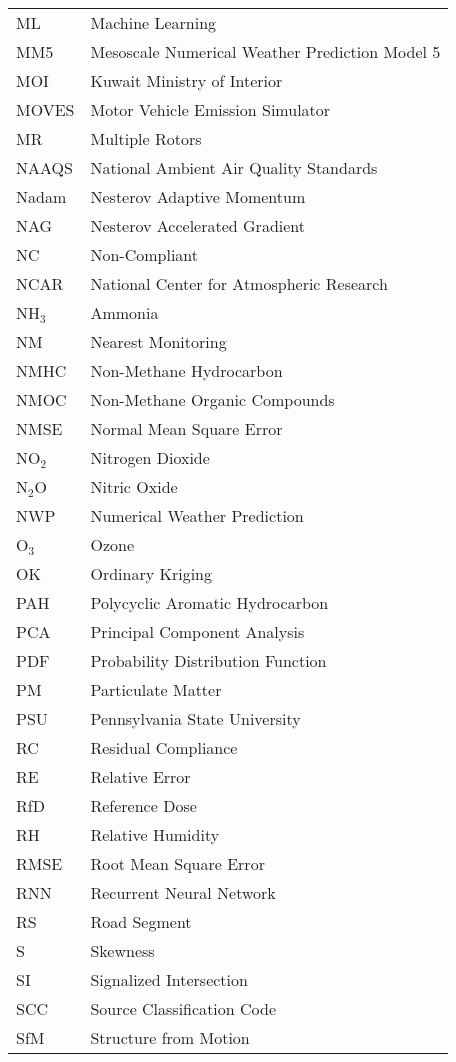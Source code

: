 \begin{longtable}{ll}
ML & Machine Learning \\
MM5 & Mesoscale Numerical Weather Prediction Model 5 \\
MOI & Kuwait Ministry of Interior \\
MOVES & Motor Vehicle Emission Simulator \\
MR & Multiple Rotors \\
NAAQS & National Ambient Air Quality Standards \\
Nadam & Nesterov Adaptive Momentum \\
NAG & Nesterov Accelerated Gradient \\
NC & Non-Compliant \\
NCAR & National Center for Atmospheric Research \\
NH$_{3}$ & Ammonia \\
NM & Nearest Monitoring \\
NMHC & Non-Methane Hydrocarbon \\
NMOC & Non-Methane Organic Compounds \\
NMSE & Normal Mean Square Error \\
NO$_{2}$ & Nitrogen Dioxide \\
N$_{2}$O & Nitric Oxide \\
NWP & Numerical Weather Prediction \\
O$_{3}$ & Ozone \\
OK & Ordinary Kriging \\
PAH & Polycyclic Aromatic Hydrocarbon \\
PCA & Principal Component Analysis \\
PDF & Probability Distribution Function \\
PM & Particulate Matter \\
PSU & Pennsylvania State University \\
RC & Residual Compliance \\
RE & Relative Error \\
RfD & Reference Dose \\
RH & Relative Humidity \\
RMSE & Root Mean Square Error \\
RNN & Recurrent Neural Network \\
RS & Road Segment \\
S & Skewness \\
SI & Signalized Intersection \\
SCC & Source Classification Code \\
SfM & Structure from Motion \\

\end{longtable}
